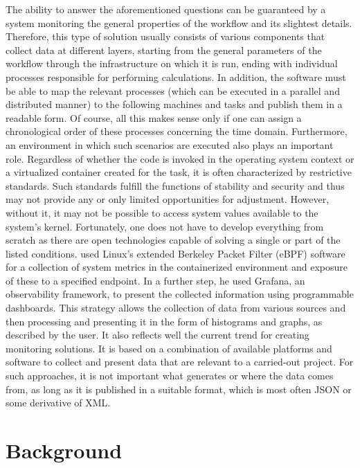 \documentclass[lettersize,journal]{IEEEtran}
\begin{document}
The ability to answer the aforementioned questions can be guaranteed by a system monitoring the general properties of the workflow and its slightest details. Therefore, this type of solution usually consists of various components that collect data at different layers, starting from the general parameters of the workflow through the infrastructure on which it is run, ending with individual processes responsible for performing calculations. In addition, the software must be able to map the relevant processes (which can be executed in a parallel and distributed manner) to the following machines and tasks and publish them in a readable form. Of course, all this makes sense only if one can assign a chronological order of these processes concerning the time domain. Furthermore, an environment in which such scenarios are executed also plays an important role. Regardless of whether the code is invoked in the operating system context or a virtualized container created for the task, it is often characterized by restrictive standards. Such standards fulfill the functions of stability and security and thus may not provide any or only limited opportunities for adjustment. However, without it, it may not be possible to access system values available to the system's kernel. 
Fortunately, one does not have to develop everything from scratch as there are open technologies capable of solving a single or part of the listed conditions. \citeauthor{levin2020viperproberethinkingmicroservice} used Linux’s extended Berkeley Packet Filter (eBPF)\cite{ebpf} software for a collection of system metrics in the containerized environment and exposure of these to a specified endpoint. In a further step, he used Grafana\cite{grafana}, an observability framework, to present the collected information using programmable dashboards. This strategy allows the collection of data from various sources and then processing and presenting it in the form of histograms and graphs, as described by the user. It also reflects well the current trend for creating monitoring solutions. It is based on a combination of available platforms and software to collect and present data that are relevant to a carried-out project. For such approaches, it is not important what generates or where the data comes from, as long as it is published in a suitable format, which is most often JSON or some derivative of XML.


\section{Background}
\end{document}
